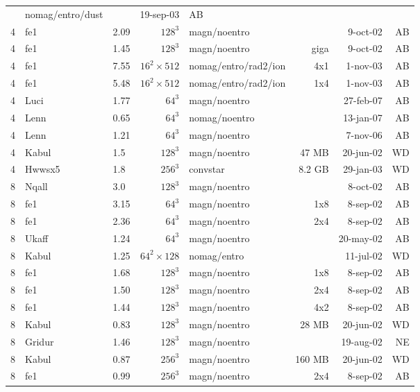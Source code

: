 \documentclass[\mydriver,12pt,twoside,notitlepage,a4paper]{article}
\begin{document}
\begin{center}
\begin{small}
\begin{longtable}{rllrlrrr}
                              & nomag/entro/dust &    & 19-sep-03 & AB \\
   4 & fe1   & 2.09 & $128^3$ & magn/noentro &        &  9-oct-02 & AB \\
   4 & fe1   & 1.45 & $128^3$ & magn/noentro & giga   &  9-oct-02 & AB \\
   4 & fe1   & 7.55 & $16^2{\times}512$
                     & nomag/entro/rad2/ion &  4x1   &  1-nov-03 & AB \\
   4 & fe1   & 5.48 & $16^2{\times}512$
                     & nomag/entro/rad2/ion &  1x4   &  1-nov-03 & AB \\
   4 & Luci  & 1.77 &  $64^3$ & magn/noentro &        & 27-feb-07 & AB \\
   4 & Lenn  & 0.65 &  $64^3$ &nomag/noentro &        & 13-jan-07 & AB \\
   4 & Lenn  & 1.21 &  $64^3$ & magn/noentro &        &  7-nov-06 & AB \\
   4 & Kabul & 1.5  & $128^3$ & magn/noentro &  47 MB & 20-jun-02 & WD \\
   4 & Hwwsx5& 1.8  & $256^3$ & convstar     & 8.2 GB & 29-jan-03 & WD \\
   8 & Nqall & 3.0  & $128^3$ & magn/noentro &        &  8-oct-02 & AB \\
   8 & fe1   & 3.15 &  $64^3$ & magn/noentro &  1x8   &  8-sep-02 & AB \\
   8 & fe1   & 2.36 &  $64^3$ & magn/noentro &  2x4   &  8-sep-02 & AB \\
   8 & Ukaff & 1.24 &  $64^3$ & magn/noentro &        & 20-may-02 & AB \\
   8 & Kabul & 1.25 & $64^2{\times}128$
                              & nomag/entro &        & 11-jul-02 & WD \\
   8 & fe1   & 1.68 & $128^3$ & magn/noentro &  1x8   &  8-sep-02 & AB \\
   8 & fe1   & 1.50 & $128^3$ & magn/noentro &  2x4   &  8-sep-02 & AB \\
   8 & fe1   & 1.44 & $128^3$ & magn/noentro &  4x2   &  8-sep-02 & AB \\
   8 & Kabul & 0.83 & $128^3$ & magn/noentro &  28 MB & 20-jun-02 & WD \\
   8 & Gridur& 1.46 & $128^3$ & magn/noentro &        & 19-aug-02 & NE \\
   8 & Kabul & 0.87 & $256^3$ & magn/noentro & 160 MB & 20-jun-02 & WD \\
   8 & fe1   & 0.99 & $256^3$ & magn/noentro &  2x4   &  8-sep-02 & AB \\

\end{longtable}
\end{small}
\end{center}
\end{document}
